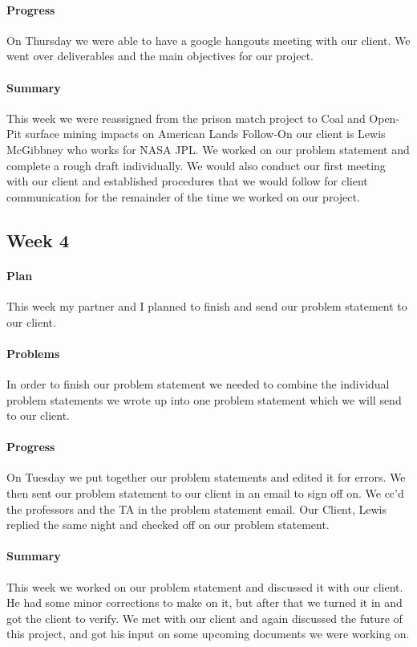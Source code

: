 \documentclass[onecolumn, draftclsnofoot,10pt, compsoc]{IEEEtran}
\begin{document}
\paragraph{Progress}
On Thursday we were able to have a google hangouts meeting with our client. We went over deliverables and the main objectives for our project.
\paragraph{Summary}
This week we were reassigned from the prison match project to  Coal and Open-Pit surface mining impacts on American Lands Follow-On our client is Lewis McGibbney who works for NASA JPL. We worked on our problem statement and complete a rough draft individually. We would also conduct our first meeting with our client and established procedures that we would follow for client communication for the remainder of the time we worked on our project.

\subsection{Week 4}
\paragraph{Plan}
This week my partner and I planned to finish and send our problem statement to our client.
\paragraph{Problems}
In order to finish our problem statement we needed to combine the individual problem statements we wrote up into one problem statement which we will send to our client.
\paragraph{Progress}
On Tuesday we put together our problem statements and edited it for errors. We then sent our problem statement to our client in an email to sign off on. We cc'd the professors and the TA in the problem statement email. Our Client, Lewis replied the same night and checked off on our problem statement.
\paragraph{Summary}
This week we worked on our problem statement and discussed it with our client. He had some minor corrections to make on it, but after that we turned it in and got the client to verify. We met with our client and again discussed the future of this project, and got his input on some upcoming documents we were working on.
\end{document}
